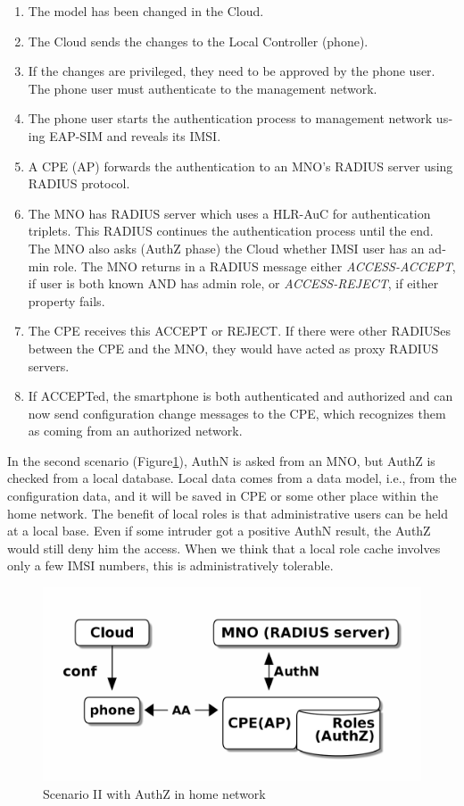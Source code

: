 \documentclass[12pt,a4paper,english]{tutthesis}
\begin{document}
\begin{otherlanguage}{english}
\begin{enumerate}
\item The model has been changed in the Cloud.
\item The Cloud sends the changes to the Local Controller (phone).
\item If the changes are privileged, they need to be approved by the
phone user.  The phone user must authenticate to the management
network.
\item The phone user starts the authentication process to management
network using EAP-SIM and reveals its IMSI.
\item A CPE (AP) forwards the authentication to an MNO's RADIUS server
using RADIUS protocol.
\item The MNO has RADIUS server which uses a HLR-AuC for authentication
triplets. This RADIUS continues the authentication process until 
the end. The MNO also asks (AuthZ phase)  the Cloud whether
IMSI user has an admin role.  The MNO returns in a RADIUS message
either \emph{ACCESS-ACCEPT}, if user is both known AND has admin role,
or \emph{ACCESS-REJECT}, if either property fails.
\item The CPE receives this ACCEPT or REJECT. If there were other
RADIUSes between the CPE and the MNO, they would have acted as
proxy RADIUS servers.
\item If ACCEPTed,  the smartphone is both authenticated and
authorized and can now send configuration change messages to the
CPE, which recognizes them as coming from an authorized network.
\end{enumerate}






\label{scenario-ii}

In the second scenario (Figure\ref{fig:scenario-II}), AuthN is asked from an MNO, but
AuthZ is checked from a local database. Local data comes from a data
model, i.e., from the configuration data, and it will be saved in CPE
or some other place within the home network. The benefit of local roles is
that administrative users can be held at a local base. Even if some
intruder got a positive AuthN result, the AuthZ  would still deny
him the access. When we think that a local role cache  involves only a few
IMSI numbers, this is administratively tolerable.


\begin{figure}[htb]
\centering
\includegraphics[width=.9\linewidth]{scenII.png}
\caption{\label{fig:scenario-II}Scenario II with AuthZ in home network}
\end{figure}



\end{otherlanguage}
\end{document}
